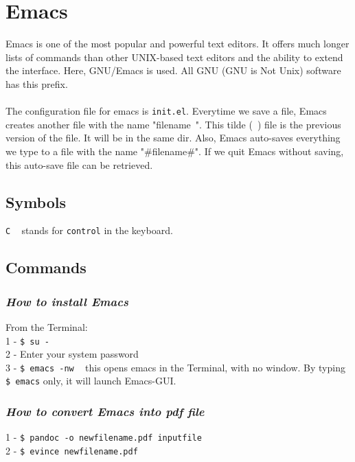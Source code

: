 \documentclass{article}
\begin{document}
{{{\newpage
\section{Emacs}
Emacs is one of the most popular and powerful text editors. It offers much longer lists of commands than other UNIX-based text editors and the ability to extend the interface. Here, GNU/Emacs is used. All GNU (GNU is Not Unix) software has this prefix. \\
\\
The configuration file for emacs is \texttt{init.el}. Everytime we save a file, Emacs creates another file with the name "filename~". This tilde (~) file is the previous version of the file. It will be in the same dir. Also, Emacs auto-saves everything we type to a file with the name "#filename#". If we quit Emacs without saving, this auto-save file can be retrieved. 

\subsection{Symbols}
\texttt{C} ~ stands for \texttt{control} in the keyboard.

\subsection{Commands}
\subsubsection{\small\textsl{How to install Emacs }}
From the Terminal:\\
1 - \texttt{\$ su -}\\
2 - Enter your system password\\
3 - \texttt{\$ emacs -nw} ~ this opens emacs in the Terminal, with no window. By typing \texttt{\$ emacs} only, it will launch Emacs-GUI.\\

\subsubsection{\small\textsl{How to convert Emacs into pdf file}}
1 - \texttt{\$ pandoc -o newfilename.pdf inputfile}\\
2 - \texttt{\$ evince newfilename.pdf} \\

}}}
\end{document}
